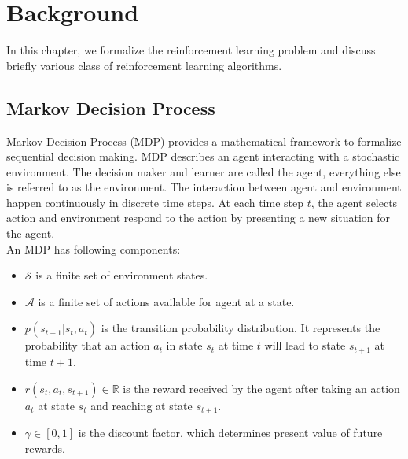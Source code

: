 \chapter{Background}\label{chapter:background}
In this chapter, we formalize the reinforcement learning problem and discuss briefly various class of reinforcement learning algorithms.

\section{Markov Decision Process}
Markov Decision Process (MDP) provides a mathematical framework to formalize sequential decision making. MDP describes an agent interacting with a stochastic environment. The decision maker and learner are called the agent, everything else is referred to as the environment. The interaction between agent and environment happen continuously in discrete time steps. At each time step $t$, the agent selects action and environment respond to the action by presenting a new situation for the agent. \\

An MDP has following components:
\begin{itemize}
\item $\mathcal{S}$ is a finite set of environment states.
\item $\mathcal{A}$ is a finite set of actions available for agent at a state.
\item $p(s_{t+1}|s_t, a_t)$ is the transition probability distribution. It represents the probability that an action $a_t$ in state $s_t$ at time $t$ will lead to state $s_{t+1}$ at time $t+1$.
\item $r(s_t, a_t, s_{t+1}) \in \mathbb{R}$ is the reward received by the agent after taking an action $a_t$ at state $s_t$ and reaching at state $s_{t+1}$.
\item $\gamma \in [0,1]$ is the discount factor, which determines present value of future rewards.
\end{itemize}


